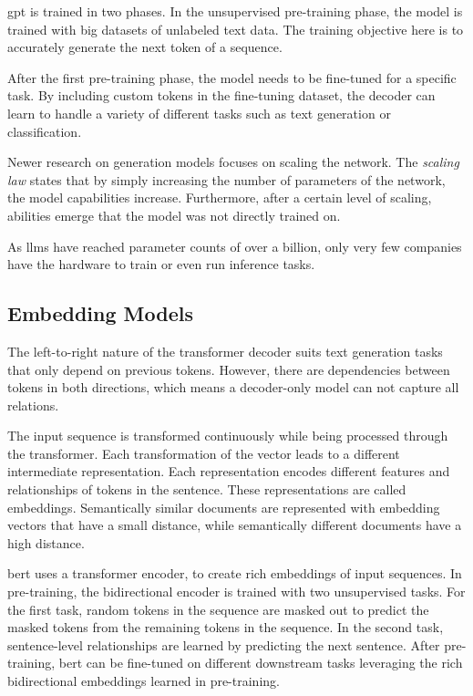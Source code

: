\documentclass[../main.tex]{subfiles}
\begin{document}
\gls{gpt} is trained in two phases.
In the unsupervised pre-training phase,
the model is trained with big datasets of unlabeled text data.
The training objective here is
to accurately generate the next token of a sequence.

After the first pre-training phase,
the model needs to be fine-tuned for a specific task.
By including custom tokens in the fine-tuning dataset,
the decoder can learn to handle a variety of different tasks
such as text generation or classification.

Newer research on generation models focuses on scaling the network.
The \emph{scaling law} states
that by simply increasing the number of parameters of the network,
the model capabilities increase.
Furthermore,
after a certain level of scaling,
abilities emerge that the model was not directly trained on.

As \glspl{llm} have reached parameter counts of over a billion,
only very few companies have the hardware to train or even run inference tasks.

\subsection{Embedding Models}
\label{subsec:embedding}

The left-to-right nature of the transformer decoder suits text generation tasks that only depend on previous tokens.
However, there are dependencies between tokens in both directions,
which means a decoder-only model can not capture all relations.

The input sequence is transformed continuously while being processed through the transformer.
Each transformation of the vector leads to a different intermediate representation.
Each representation encodes different features and relationships of tokens in the sentence.
These representations are called embeddings.
Semantically similar documents are represented with embedding vectors that have a small distance,
while semantically different documents have a high distance.

\Gls{bert} \cite{Devlin2019} uses a transformer encoder,
to create rich embeddings of input sequences.
In pre-training, the bidirectional encoder is trained with two unsupervised tasks.
For the first task,
random tokens in the sequence are masked out to predict the masked tokens from the remaining tokens in the sequence.
In the second task, sentence-level relationships are learned by predicting the next sentence.
After pre-training,  \gls{bert}  can be fine-tuned on different downstream tasks
leveraging the rich bidirectional embeddings learned in pre-training.
\end{document}
